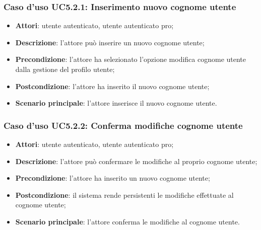 \subsubsection{Caso d'uso UC5.2.1: Inserimento nuovo cognome utente}

\begin{itemize}
	\item \textbf{Attori}: utente autenticato, utente autenticato pro;
	\item \textbf{Descrizione}: l'attore può inserire un nuovo cognome utente;
	\item \textbf{Precondizione}:  l'attore ha selezionato l'opzione modifica cognome utente dalla gestione del profilo utente; 
	\item \textbf{Postcondizione}:  l'attore ha inserito il nuovo cognome utente;
	\item \textbf{Scenario principale}: l'attore inserisce il nuovo cognome utente.
\end{itemize}

\subsubsection{Caso d'uso UC5.2.2: Conferma modifiche cognome utente}

\begin{itemize}
	\item \textbf{Attori}: utente autenticato, utente autenticato pro;
	\item \textbf{Descrizione}: l'attore può confermare le modifiche al proprio cognome utente;
	\item \textbf{Precondizione}: l'attore ha inserito un nuovo cognome utente;
	\item \textbf{Postcondizione}: il sistema rende persistenti le modifiche effettuate al cognome utente;
	\item \textbf{Scenario principale}: l'attore conferma le modifiche al cognome utente.
\end{itemize}

